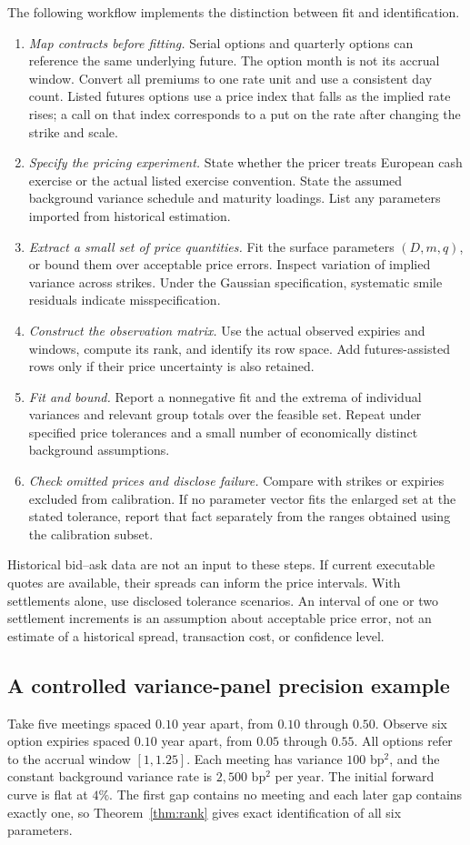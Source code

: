 The following workflow implements the distinction between fit and identification.
\begin{enumerate}
\item \emph{Map contracts before fitting.} Serial options and quarterly options can reference the same underlying future. The option month is not its accrual window. Convert all premiums to one rate unit and use a consistent day count. Listed futures options use a price index that falls as the implied rate rises; a call on that index corresponds to a put on the rate after changing the strike and scale.
\item \emph{Specify the pricing experiment.} State whether the pricer treats European cash exercise or the actual listed exercise convention. State the assumed background variance schedule and maturity loadings. List any parameters imported from historical estimation.
\item \emph{Extract a small set of price quantities.} Fit the surface parameters $(D,m,q)$, or bound them over acceptable price errors. Inspect variation of implied variance across strikes. Under the Gaussian specification, systematic smile residuals indicate misspecification.
\item \emph{Construct the observation matrix.} Use the actual observed expiries and windows, compute its rank, and identify its row space. Add futures-assisted rows only if their price uncertainty is also retained.
\item \emph{Fit and bound.} Report a nonnegative fit and the extrema of individual variances and relevant group totals over the feasible set. Repeat under specified price tolerances and a small number of economically distinct background assumptions.
\item \emph{Check omitted prices and disclose failure.} Compare with strikes or expiries excluded from calibration. If no parameter vector fits the enlarged set at the stated tolerance, report that fact separately from the ranges obtained using the calibration subset.
\end{enumerate}
Historical bid--ask data are not an input to these steps. If current executable quotes are available, their spreads can inform the price intervals. With settlements alone, use disclosed tolerance scenarios. An interval of one or two settlement increments is an assumption about acceptable price error, not an estimate of a historical spread, transaction cost, or confidence level.

\subsection{A controlled variance-panel precision example}\label{sec:synthetic}
Take five meetings spaced $0.10$ year apart, from $0.10$ through $0.50$. Observe six option expiries spaced $0.10$ year apart, from $0.05$ through $0.55$. All options refer to the accrual window $[1,1.25]$. Each meeting has variance $100$ bp$^2$, and the constant background variance rate is $2{,}500$ bp$^2$ per year. The initial forward curve is flat at $4\%$. The first gap contains no meeting and each later gap contains exactly one, so Theorem~\ref{thm:rank} gives exact identification of all six parameters.

